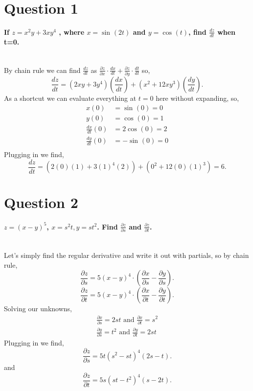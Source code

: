 \section{Question 1}%
\label{sec: Question 1 }
\paragraph{If $ z=x^2y+3xy^{ 4 } $ , where $ x=\sin^{  } \left( 2t \right)  $ and $ y=\cos^{  } \left( t \right)  $, find $ \frac{ dz }{ dt }  $ when t=0.\\ \\}
By chain rule we can find $ \frac{ dz }{ dt }  $ as $ \frac{ \partial z}{\partial x} \cdot \frac{ dx }{ dt } + \frac{ \partial z}{\partial y} \cdot \frac{ dt }{ dt }  $ so,
\[
\frac{ dz }{ dt } = \left( 2xy+3y^{ 4 } \right) \left( \frac{ dx }{ dt }  \right) + \left( x^2+12xy^3 \right) \left( \frac{ dy }{ dt }  \right) 
.\] 
As a shortcut we can evaluate everything at $ t=0 $ here without expanding, so,
\begin{align*}
x\left( 0 \right) &= \sin^{  } \left( 0 \right) = 0 \\
y\left( 0 \right) &= \cos^{  } \left( 0 \right) =1 \\
\frac{ dx }{ dt } \left( 0 \right) &= 2\cos^{  } \left( 0 \right) =2 \\
\frac{ dy }{ dt } \left( 0 \right) &= -\sin^{  } \left( 0 \right) = 0 \\
\end{align*}
Plugging in we find,
\[
\frac{ dz }{ dt } = \left( 2\left( 0 \right) \left( 1 \right) + 3\left( 1 \right) ^{ 4 } \left( 2 \right) \right) + \left( 0^2+12\left( 0 \right) \left( 1 \right) ^3 \right) = 6
.\] 
\section{Question 2}%
\label{sec: Question 2 }
\paragraph{$ z=\left( x-y \right) ^{ 5 } $, $ x=s^2t,y=s t^2 $. Find $ \frac{ \partial z}{\partial s}  $ and $ \frac{ \partial z}{\partial t}  $. \\ \\}
Let's simply find the regular derivative and write it out with partials, so by chain rule,
\[
\frac{ \partial z}{\partial s} = 5\left( x-y \right) ^{ 4 } \cdot \left( \frac{ \partial x}{\partial s} - \frac{ \partial y}{\partial s}  \right)
.\] 
\[
\frac{ \partial z}{\partial t} = 5\left( x-y \right) ^{ 4 } \cdot \left( \frac{ \partial x}{\partial t} - \frac{ \partial y}{\partial t}  \right) 
.\] 
Solving our unknowns,
\begin{gather*}
\frac{ \partial x}{\partial s} = 2st\text{ and } \frac{ \partial x}{\partial t} = s^2\\
\frac{ \partial y}{\partial s} = t^2 \text{ and }\frac{ \partial y}{\partial t} = 2st
\end{gather*}
Plugging in we find,
\[
\frac{ \partial z}{\partial s} = 5t\left( s ^2 - st \right) ^{ 4 }\left( 2s-t \right) 
.\] 
and
\[
\frac{ \partial z}{\partial t} = 5s\left( st-t^2 \right) ^{ 4 }\left( s-2t \right) 
.\] 
